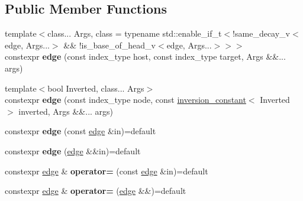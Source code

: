 \subsection*{Public Member Functions}
\begin{DoxyCompactItemize}
\item 
\mbox{\label{classsequoia_1_1maths_1_1edge_a52510e7e210f4f6d38b23da69610ba1f}} 
{\footnotesize template$<$class... Args, class  = typename std\+::enable\+\_\+if\+\_\+t$<$!same\+\_\+decay\+\_\+v$<$edge, Args...$>$ \&\& !is\+\_\+base\+\_\+of\+\_\+head\+\_\+v$<$edge, Args...$>$$>$$>$ }\\constexpr {\bfseries edge} (const index\+\_\+type host, const index\+\_\+type target, Args \&\&... args)
\item 
\mbox{\label{classsequoia_1_1maths_1_1edge_aeed73af87ac1101bff306a7fdab7d62b}} 
{\footnotesize template$<$bool Inverted, class... Args$>$ }\\constexpr {\bfseries edge} (const index\+\_\+type node, const \mbox{\hyperlink{structsequoia_1_1maths_1_1inversion__constant}{inversion\+\_\+constant}}$<$ Inverted $>$ inverted, Args \&\&... args)
\item 
\mbox{\label{classsequoia_1_1maths_1_1edge_ace273d9cfefb7a0ef0970f536cc6154f}} 
constexpr {\bfseries edge} (const \mbox{\hyperlink{classsequoia_1_1maths_1_1edge}{edge}} \&in)=default
\item 
\mbox{\label{classsequoia_1_1maths_1_1edge_aabdb348dfdfdc98edbc6e17773cee8f5}} 
constexpr {\bfseries edge} (\mbox{\hyperlink{classsequoia_1_1maths_1_1edge}{edge}} \&\&in)=default
\item 
\mbox{\label{classsequoia_1_1maths_1_1edge_a094bccb9e6eeed45098c421e79041140}} 
constexpr \mbox{\hyperlink{classsequoia_1_1maths_1_1edge}{edge}} \& {\bfseries operator=} (const \mbox{\hyperlink{classsequoia_1_1maths_1_1edge}{edge}} \&in)=default
\item 
\mbox{\label{classsequoia_1_1maths_1_1edge_a203398b3d881f2dd3020ad2b078866ec}} 
constexpr \mbox{\hyperlink{classsequoia_1_1maths_1_1edge}{edge}} \& {\bfseries operator=} (\mbox{\hyperlink{classsequoia_1_1maths_1_1edge}{edge}} \&\&)=default

\end{DoxyCompactItemize}
